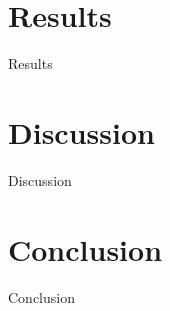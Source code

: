 \documentclass{article}
\begin{document}
\section{Results}
  Results







\section{Discussion}
  Discussion







\section{Conclusion}
  Conclusion










  \appendix
\end{document}
